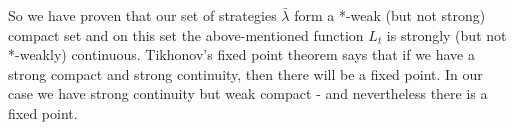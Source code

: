 \documentclass[a4paper,11pt,english]{article}
\theoremstyle{definition}
\begin{document}
So we have proven that our set of strategies $\bar\lambda$ form a *-weak (but not strong) compact set 
and on this set the above-mentioned function $L_t$ is strongly (but not *-weakly) continuous. 
Tikhonov's fixed point theorem says that if we have a strong compact and strong continuity, 
then there will be a fixed point. In our case we have strong continuity but weak compact - and nevertheless there is a fixed point.
\end{document}
